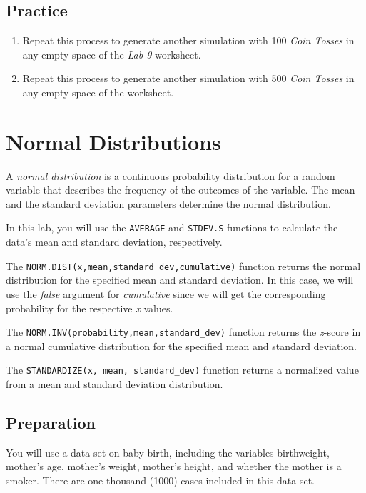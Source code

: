 \documentclass[
  12pt,
  letterpaper,
]{book}
\providecommand{\tightlist}{%
  \setlength{\itemsep}{0pt}\setlength{\parskip}{0pt}}
\begin{document}
\hypertarget{practice-8}{%
\section{Practice}\label{practice-8}}

\begin{enumerate}
\def\labelenumi{\arabic{enumi}.}
\tightlist
\item
  Repeat this process to generate another simulation with 100 \emph{Coin Tosses} in any empty space of the \emph{Lab 9} worksheet.
\item
  Repeat this process to generate another simulation with 500 \emph{Coin Tosses} in any empty space of the worksheet.
\end{enumerate}

\hypertarget{normal-distributions}{%
\chapter{Normal Distributions}\label{normal-distributions}}

A \emph{normal distribution} is a continuous probability distribution for a random variable that describes the frequency of the outcomes of the variable. The mean and the standard deviation parameters determine the normal distribution.

In this lab, you will use the \texttt{AVERAGE} and \texttt{STDEV.S} functions to calculate the data's mean and standard deviation, respectively.

The \texttt{NORM.DIST(x,mean,standard\_dev,cumulative)} function returns the normal distribution for the specified mean and standard deviation. In this case, we will use the \emph{false} argument for \emph{cumulative} since we will get the corresponding probability for the respective \emph{x} values.

The \texttt{NORM.INV(probability,mean,standard\_dev)} function returns the \emph{z}-score in a normal cumulative distribution for the specified mean and standard deviation.

The \texttt{STANDARDIZE(x,\ mean,\ standard\_dev)} function returns a normalized value from a mean and standard deviation distribution.

\hypertarget{preparation-7}{%
\section{Preparation}\label{preparation-7}}

You will use a data set on baby birth, including the variables birthweight, mother's age, mother's weight, mother's height, and whether the mother is a smoker. There are one thousand (1000) cases included in this data set.
\end{document}
